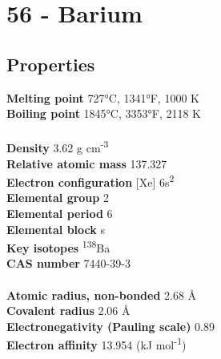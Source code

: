\section{56 - Barium}
\label{sec:elem-barium}
\subsection{Properties}
\textbf{Melting point} 727°C, 1341°F, 1000 K\\
\textbf{Boiling point} 1845°C, 3353°F, 2118 K\\
\\
\textbf{Density} 3.62 g cm\textsuperscript{-3}\\
\textbf{Relative atomic mass} 137.327\\
\textbf{Electron configuration} [Xe] 6s\textsuperscript{2}\\
\textbf{Elemental group} 2\\
\textbf{Elemental period} 6\\
\textbf{Elemental block} s\\
\textbf{Key isotopes} \textsuperscript{138}Ba\\
\textbf{CAS number} 7440-39-3\\
\\
\textbf{Atomic radius, non-bonded} 2.68 Å\\
\textbf{Covalent radius} 2.06 Å\\
\textbf{Electronegativity (Pauling scale)} 0.89\\
\textbf{Electron affinity} 13.954 (kJ mol\textsuperscript{-1})\\
